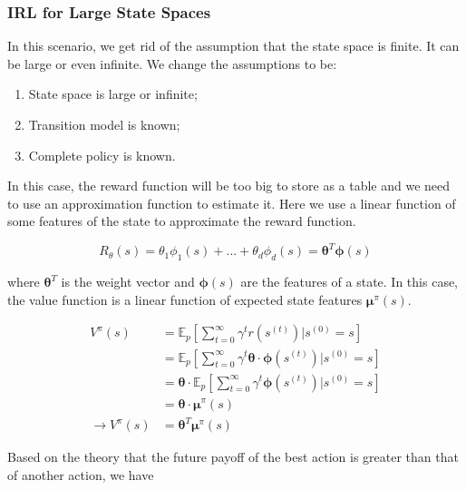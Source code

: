 \documentclass[11pt]{article}
\begin{document}
\subsubsection{IRL for Large State Spaces}

In this scenario, we get rid of the assumption that the state space is finite. It can be large or even infinite. We change the assumptions to be:

\begin{enumerate}
\item State space is large or infinite;

\item Transition model is known;

\item Complete policy is known.
\end{enumerate}


In this case, the reward function will be too big to store as a table and we need to  use an approximation function to estimate it. Here we use a linear function of some features of the state to approximate the reward function.

\begin{equation*}
R_\theta(s) = \theta_1\phi_1(s) + ... + \theta_d\phi_d(s) = \boldsymbol\theta^T \boldsymbol\phi(s)  
\end{equation*}

where $\boldsymbol\theta^T$ is the weight vector and $\boldsymbol\phi(s)$ are the features of a state. In this case, the value function is a linear function of expected state features $\boldsymbol\mu^\pi(s)$.


\begin{equation}
\begin{split}
V^\pi(s) &= \mathbb{E}_p[\sum_{t=0}^\infty \gamma^tr(s^{(t)}) | s^{(0)} = s]\\
& = \mathbb{E}_p[\sum_{t=0}^\infty \gamma^t \boldsymbol\theta \cdot \boldsymbol\phi(s^{(t)}) | s^{(0)} = s]\\
& = \boldsymbol{\theta} \cdot \mathbb{E}_p [\sum_{t=0}^\infty \gamma^t \boldsymbol\phi(s^{(t)}) | s^{(0)} = s] \\
& = \boldsymbol{\theta} \cdot \boldsymbol{\mu}^\pi(s)\\
\rightarrow V^\pi(s) &= \boldsymbol\theta^T \boldsymbol\mu^\pi(s)    
\end{split}
\label{equ:vpi2}
\end{equation}

Based on the theory that the future payoff of the best action is greater 
than that of another action, we have
\end{document}
